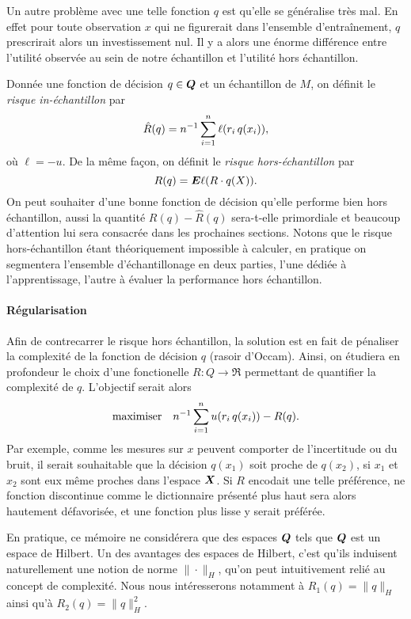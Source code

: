 Un autre problème avec une telle fonction $q$ est qu'elle se généralise très mal. En effet
pour toute observation $x$ qui ne figurerait dans l'ensemble d'entraînement, $q$
prescrirait alors un investissement nul. Il y a alors une énorme différence entre
l'utilité observée au sein de notre échantillon et l'utilité hors échantillon.

Donnée une fonction de décision $q \in \bm Q$ et un échantillon de $M$, on définit le
\textit{risque in-échantillon} par
\begin{equation}
  \hat R(q) = n^{-1}\sum_{i=1}^n \ell(r_i\,q(x_i)),
\end{equation}
où $\ell = -u$. De la même façon, on définit le \textit{risque hors-échantillon} par
\begin{equation}
  R(q) = \bm E \ell(R \cdot q(X)).
\end{equation}
On peut souhaiter d'une bonne fonction de décision qu'elle performe bien hors échantillon,
aussi la quantité $R(q) - \hat R(q)$ sera-t-elle primordiale et beaucoup d'attention lui
sera consacrée dans les prochaines sections. Notons que le risque hors-échantillon étant
théoriquement impossible à calculer, en pratique on segmentera l'ensemble d'échantillonage
en deux parties, l'une dédiée à l'apprentissage, l'autre à évaluer la performance hors
échantillon.


\paragraph{Régularisation}

Afin de contrecarrer le risque hors échantillon, la solution est en fait de pénaliser la
complexité de la fonction de décision $q$ (rasoir d'Occam). Ainsi, on étudiera en
profondeur le choix d'une fonctionelle $R : Q \to \Re$ permettant de quantifier la complexité
de $q$. L'objectif serait alors
\begin{equation}
  \displaystyle{\begin{array}{ll} \displaystyle{\operatorname*{maximiser}_{}} & \displaystyle{n^{-1} \sum_{i=1}^nu(r_i\, q(x_i)) - R(q).} \end{array}}
\end{equation}
Par exemple, comme les mesures sur $x$ peuvent comporter de l'incertitude ou du bruit, il
serait souhaitable que la décision $q(x_1)$ soit proche de $q(x_2)$, si $x_1$ et $x_2$
sont eux même proches dans l'espace $\bm{X}$. Si $R$ encodait une telle préférence, ne
fonction discontinue comme le dictionnaire présenté plus haut sera alors hautement
défavorisée, et une fonction plus lisse y serait préférée.

En pratique, ce mémoire ne considérera que des espaces $\bm Q$ tels que $\bm Q$ est un espace de
Hilbert. Un des avantages des espaces de Hilbert, c'est qu'ils induisent
naturellement une notion de norme $\|\cdot\|_H$, qu'on peut intuitivement relié au concept de
complexité. Nous nous intéresserons notamment à $R_1(q) = \|q\|_H$ ainsi qu'à
$R_2(q) = \|q\|_H^2$.

